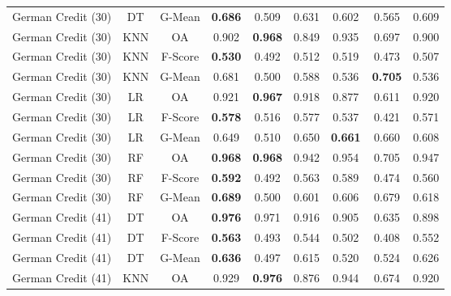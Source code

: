 \begin{longtable}{ccccccccc}
German Credit (30) &         DT &  G-Mean & \textbf{0.686} &          0.509 &          0.631 &          0.602 &          0.565 &          0.609 \\
German Credit (30) &        KNN &      OA &          0.902 & \textbf{0.968} &          0.849 &          0.935 &          0.697 &          0.900 \\
German Credit (30) &        KNN & F-Score & \textbf{0.530} &          0.492 &          0.512 &          0.519 &          0.473 &          0.507 \\
German Credit (30) &        KNN &  G-Mean &          0.681 &          0.500 &          0.588 &          0.536 & \textbf{0.705} &          0.536 \\
German Credit (30) &         LR &      OA &          0.921 & \textbf{0.967} &          0.918 &          0.877 &          0.611 &          0.920 \\
German Credit (30) &         LR & F-Score & \textbf{0.578} &          0.516 &          0.577 &          0.537 &          0.421 &          0.571 \\
German Credit (30) &         LR &  G-Mean &          0.649 &          0.510 &          0.650 & \textbf{0.661} &          0.660 &          0.608 \\
German Credit (30) &         RF &      OA & \textbf{0.968} & \textbf{0.968} &          0.942 &          0.954 &          0.705 &          0.947 \\
German Credit (30) &         RF & F-Score & \textbf{0.592} &          0.492 &          0.563 &          0.589 &          0.474 &          0.560 \\
German Credit (30) &         RF &  G-Mean & \textbf{0.689} &          0.500 &          0.601 &          0.606 &          0.679 &          0.618 \\
German Credit (41) &         DT &      OA & \textbf{0.976} &          0.971 &          0.916 &          0.905 &          0.635 &          0.898 \\
German Credit (41) &         DT & F-Score & \textbf{0.563} &          0.493 &          0.544 &          0.502 &          0.408 &          0.552 \\
German Credit (41) &         DT &  G-Mean & \textbf{0.636} &          0.497 &          0.615 &          0.520 &          0.524 &          0.626 \\
German Credit (41) &        KNN &      OA &          0.929 & \textbf{0.976} &          0.876 &          0.944 &          0.674 &          0.920 \\

\end{longtable}
